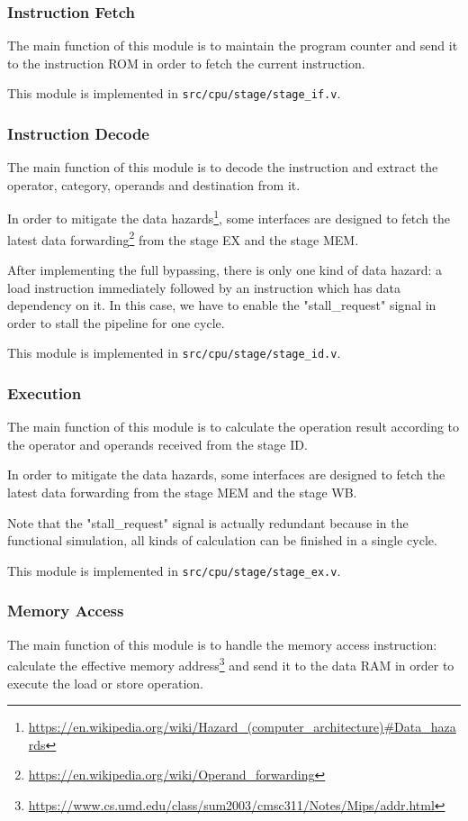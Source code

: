\documentclass{article}
\begin{document}
\subsubsection{Instruction Fetch}
The main function of this module is to maintain the program counter and send it to the instruction ROM in order to fetch the current instruction.


This module is implemented in \texttt{src/cpu/stage/stage\_if.v}.

\subsubsection{Instruction Decode}
The main function of this module is to decode the instruction and extract the operator, category, operands and destination from it.


In order to mitigate the data hazards\footnote{\url{https://en.wikipedia.org/wiki/Hazard\_(computer\_architecture)\#Data\_hazards}}, some interfaces are designed to fetch the latest data forwarding\footnote{\url{https://en.wikipedia.org/wiki/Operand\_forwarding}} from the stage EX and the stage MEM.

After implementing the full bypassing, there is only one kind of data hazard: a load instruction immediately followed by an instruction which has data dependency on it. In this case, we have to enable the "stall\_request" signal in order to stall the pipeline for one cycle.

This module is implemented in \texttt{src/cpu/stage/stage\_id.v}.

\newpage
\subsubsection{Execution}
The main function of this module is to calculate the operation result according to the operator and operands received from the stage ID.


In order to mitigate the data hazards, some interfaces are designed to fetch the latest data forwarding from the stage MEM and the stage WB.

Note that the "stall\_request" signal is actually redundant because in the functional simulation, all kinds of calculation can be finished in a single cycle.

This module is implemented in \texttt{src/cpu/stage/stage\_ex.v}.

\newpage
\subsubsection{Memory Access}
The main function of this module is to handle the memory access instruction: calculate the effective memory address\footnote{\url{https://www.cs.umd.edu/class/sum2003/cmsc311/Notes/Mips/addr.html}} and send it to the data RAM in order to execute the load or store operation.

\end{document}

